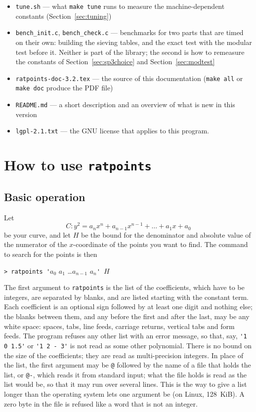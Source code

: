 \documentclass[12pt,a4paper,oneside]{amsart}
\begin{document}
{\begin{itemize}
        \texttt{make testmaxdegree} run
  \item \texttt{tune.sh} --- what \texttt{make tune} runs to measure the
        machine-dependent constants (Section~\ref{sec:tuning})
  \item \texttt{bench\_init.c}, \texttt{bench\_check.c} --- benchmarks for
        two parts that are timed on their own: building the sieving tables,
        and the exact test with the modular test before it.  Neither is
        part of the library; the second is how to remeasure the constants
        of Section~\ref{sec:sp3choice} and Section~\ref{sec:modtest}
  \item \texttt{ratpoints-doc-3.2.tex} --- the source of this documentation
        (\texttt{make all} or \texttt{make doc} produce the PDF file)
  \item \texttt{README.md} --- a short description and an overview of what
        is new in this version
  \item \texttt{lgpl-2.1.txt} --- the GNU license that applies to this program.
\end{itemize}%
}


\section{How to use \texttt{ratpoints}}\label{sec:usage}

\subsection{Basic operation}

Let
\[ C : y^2 = a_n x^n + a_{n-1} x^{n-1} + \dots + a_1 x + a_0 \]
be your
curve, and let $H$ be the bound for the denominator and absolute value
of the numerator of the $x$-coordinate of the points you want to find.
The command to search for the points is then

\verb+> ratpoints '+$a_0$ $a_1$ \dots $a_{n-1}$ $a_n$\verb+' +$H$

The first argument to \texttt{ratpoints} is the list of the coefficients,
which have to be integers, are separated by blanks, and are listed
starting with the constant term. Each coefficient is an optional sign
followed by at least one digit and nothing else; the blanks between them,
and any before the first and after the last, may be any white space:
spaces, tabs, line feeds, carriage returns, vertical tabs and form feeds.
The program refuses any other list with an error message, so that, say,
\verb+'1 0 1.5'+ or \verb+'1 2 - 3'+ is not read as some other
polynomial. There is no bound on the size of the
coefficients; they are read as multi-precision integers.
In place of the list, the first argument may be \verb+@+ followed by the
name of a file that holds the list, or \verb+@-+, which reads it from
standard input; what the file holds is read as the list would be, so that
it may run over several lines. This is the way to give a list longer than
the operating system lets one argument be (on Linux, 128~KiB). A zero
byte in the file is refused like a word that is not an integer.
\end{document}
